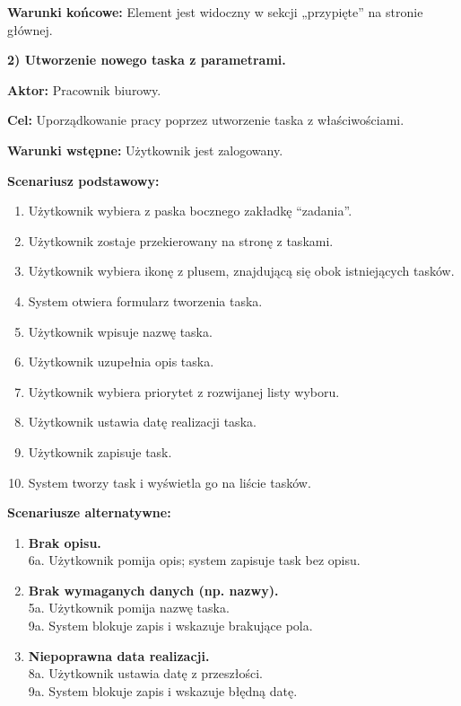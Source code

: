 \documentclass[12pt,a4paper,twoside]{report}
\begin{document}
\noindent \textbf{Warunki końcowe:} Element jest widoczny w sekcji „przypięte'' na stronie głównej.

\vspace{\baselineskip}

\noindent \textbf{2) Utworzenie nowego taska z parametrami.}

\noindent \textbf{Aktor:} Pracownik biurowy.

\noindent \textbf{Cel:} Uporządkowanie pracy poprzez utworzenie taska z właściwościami.

\noindent \textbf{Warunki wstępne:} Użytkownik jest zalogowany.

\noindent \textbf{Scenariusz podstawowy:}

\begin{enumerate}
\def\labelenumi{\arabic{enumi}.}
\item
  Użytkownik wybiera z paska bocznego zakładkę ``zadania''.
\item
  Użytkownik zostaje przekierowany na stronę z taskami.
\item
  Użytkownik wybiera ikonę z plusem, znajdującą się obok istniejących tasków.
\item
  System otwiera formularz tworzenia taska.
\item
  Użytkownik wpisuje nazwę taska.
\item
  Użytkownik uzupełnia opis taska.
\item
  Użytkownik wybiera priorytet z rozwijanej listy wyboru.
\item
  Użytkownik ustawia datę realizacji taska.
\item
  Użytkownik zapisuje task.
\item
  System tworzy task i wyświetla go na liście tasków.
\end{enumerate}

\noindent \textbf{Scenariusze alternatywne:}

\begin{enumerate}
\def\labelenumi{\arabic{enumi}.}
\item
  \textbf{Brak opisu.}\\
  6a. Użytkownik pomija opis; system zapisuje task bez opisu.
\item
  \textbf{Brak wymaganych danych (np. nazwy).}\\
  5a. Użytkownik pomija nazwę taska.\\
  9a. System blokuje zapis i wskazuje brakujące pola.
\item
  \textbf{Niepoprawna data realizacji.}\\
  8a. Użytkownik ustawia datę z przeszłości.\\
  9a. System blokuje zapis i wskazuje błędną datę.
\end{enumerate}
\end{document}
